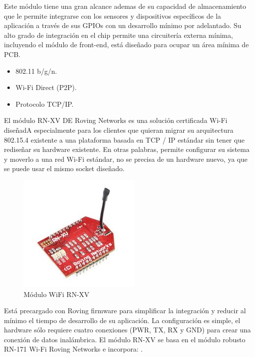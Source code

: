 				Este módulo tiene una gran alcance ademas de su capacidad de almacenamiento que le permite integrarse con los sensores y dispositivos específicos de la aplicación a través de sus GPIOs con un desarrollo mínimo por adelantado. Su alto grado de integración en el chip permite una circuitería externa mínima, incluyendo el módulo de front-end, está diseñado para ocupar un área mínima de PCB. 
				
				\begin{itemize}	
					
					\item 802.11 b/g/n.
					
					\item Wi-Fi Direct (P2P).
					
					\item Protocolo TCP/IP.
					
				\end{itemize}
		
				El módulo RN-XV \cite{RNXV} DE Roving Networks es una solución certificada Wi-Fi diseñadA especialmente para los clientes que quieran migrar su arquitectura 802.15.4 existente a una plataforma basada en TCP / IP estándar sin tener que rediseñar su hardware existente. En otras palabras, permite configurar su sistema y moverlo a una red Wi-Fi estándar, no se precisa de un hardware nuevo, ya que se puede usar el mismo socket diseñado.
				
				\begin{figure}[h]
					\centering
					\includegraphics{imagenes/RNXV.JPG}
					\caption{Módulo WiFi RN-XV}
					\label{contexto:figura}
				\end{figure}
				
				Está precargado con Roving firmware para simplificar la integración y reducir al mínimo el tiempo de desarrollo de su aplicación. La configuración es simple, el hardware sólo requiere cuatro conexiones (PWR, TX, RX y GND) para crear una conexión de datos inalámbrica. El módulo RN-XV  se basa en el módulo robusto RN-171 Wi-Fi Roving Networks e incorpora: . 
				
